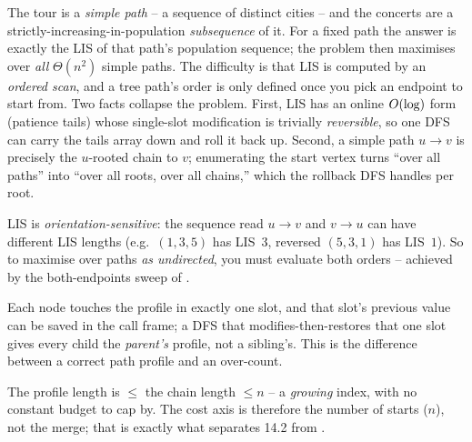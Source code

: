 The tour is a \emph{simple path} -- a sequence of distinct cities -- and the concerts
are a strictly-increasing-in-population \emph{subsequence} of it. For a fixed path the
answer is exactly the LIS of that path's population sequence; the problem then maximises
over \emph{all} $\Theta(n^2)$ simple paths. The difficulty is that LIS is computed by an
\emph{ordered scan}, and a tree path's order is only defined once you pick an endpoint to
start from. Two facts collapse the problem. First, LIS has an online $O(\log)$ form
(patience tails) whose single-slot modification is trivially \emph{reversible}, so one DFS
can carry the tails array down and roll it back up. Second, a simple path $u\!\to\!v$ is
precisely the $u$-rooted chain to $v$; enumerating the start vertex turns ``over all paths''
into ``over all roots, over all chains,'' which the rollback DFS handles per root.

\begin{observation}
LIS is \emph{orientation-sensitive}: the sequence read $u\!\to\!v$ and $v\!\to\!u$ can have
different LIS lengths (e.g.\ $(1,3,5)$ has LIS~$3$, reversed $(5,3,1)$ has LIS~$1$). So to
maximise over paths \emph{as undirected}, you must evaluate both orders -- achieved by the
both-endpoints sweep of .
\end{observation}
\begin{observation}
Each node touches the profile in exactly one slot, and that slot's previous value can be
saved in the call frame; a DFS that modifies-then-restores that one slot gives every child
the \emph{parent's} profile, not a sibling's. This is the difference between a correct
path profile and an over-count.
\end{observation}
\begin{observation}
The profile length is $\le$ the chain length $\le n$ -- a \emph{growing} index, with no
constant budget to cap by. The cost axis is therefore the number of starts ($n$), not the
merge; that is exactly what separates 14.2 from .
\end{observation}

